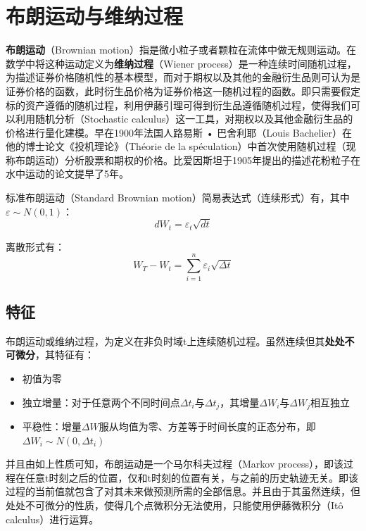\documentclass[11pt]{article}
\begin{document}
\section{布朗运动与维纳过程}

\textbf{布朗运动}（Brownian motion）指是微小粒子或者颗粒在流体中做无规则运动。在数学中将这种运动定义为\textbf{维纳过程}（Wiener process）是一种连续时间随机过程，为描述证券价格随机性的基本模型，而对于期权以及其他的金融衍生品则可认为是证券价格的函数，此时衍生品价格为证券价格这一随机过程的函数。即只需要假定标的资产遵循的随机过程，利用伊藤引理可得到衍生品遵循随机过程，使得我们可以利用随机分析（Stochastic calculus）这一工具，对期权以及其他金融衍生品的价格进行量化建模。早在1900年法国人路易斯 • 巴舍利耶（Louis Bachelier）在他的博士论文《投机理论》（Théorie de la spéculation）中首次使用随机过程（现称布朗运动）分析股票和期权的价格。比爱因斯坦于1905年提出的描述花粉粒子在水中运动的论文提早了5年。

标准布朗运动（Standard Brownian motion）简易表达式（连续形式）有，其中$\varepsilon \sim N(0,1)$：
\begin{equation*}
    dW_t = \varepsilon_t \sqrt{dt}
\end{equation*}

离散形式有：
\begin{equation*}
    W_T - W_t = \sum^n_{i=1} \varepsilon_i \sqrt{\Delta t}
\end{equation*}

\subsection{特征}

布朗运动或维纳过程，为定义在非负时域t上连续随机过程。虽然连续但其\textbf{处处不可微分}，其特征有：
\begin{itemize}
    \item 初值为零
    \item 独立增量：对于任意两个不同时间点$\Delta t_i$与$\Delta t_j$，其增量$\Delta W_i$与$\Delta W_j$相互独立
    \item 平稳性：增量$\Delta W$服从均值为零、方差等于时间长度的正态分布，即$\Delta W_i \sim N(0,\Delta t_i)$
\end{itemize}

并且由如上性质可知，布朗运动是一个马尔科夫过程（Markov process），即该过程在任意t时刻之后的位置，仅和t时刻的位置有关，与之前的历史轨迹无关。即该过程的当前值就包含了对其未来做预测所需的全部信息。并且由于其虽然连续，但处处不可微分的性质，使得几个点微积分无法使用，只能使用伊藤微积分（Itô calculus）进行运算。
\end{document}
